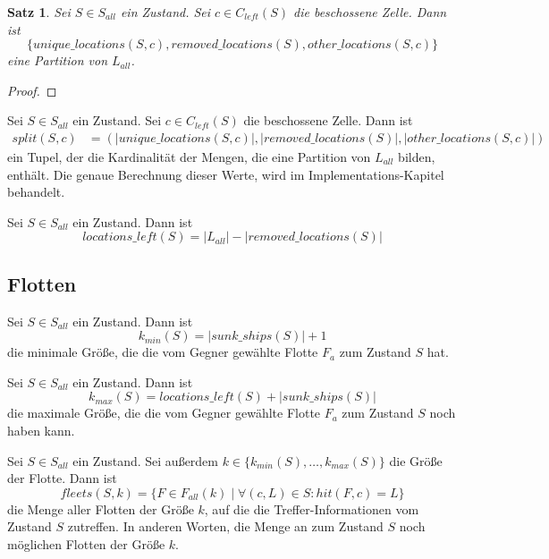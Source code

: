 \documentclass[a4paper,12pt]{llncs}
\numberwithin{equation}{section}
\newtheorem{satz}{Satz}
\begin{document}
\begin{satz}
Sei $S\in S_{all}$ ein Zustand.
Sei $c \in C_{left}(S)$ die beschossene Zelle.
Dann ist
\[
\{unique\_locations(S, c), removed\_locations(S), other\_locations(S, c)\}
\]
eine Partition von $L_{all}$.
\end{satz}

\begin{proof}
\end{proof}

\begin{definition}
Sei $S\in S_{all}$ ein Zustand.
Sei $c \in C_{left}(S)$ die beschossene Zelle.
Dann ist
\begin{align}
split(S,c)&=(|unique\_locations(S, c)|, |removed\_locations(S)|, |other\_locations(S, c)|)
\nonumber
\end{align}
ein Tupel, der die Kardinalität der Mengen, die eine Partition von $L_{all}$ bilden, enthält.
Die genaue Berechnung dieser Werte, wird im Implementations-Kapitel behandelt.
\end{definition}

\begin{definition}
Sei $S\in S_{all}$ ein Zustand.
Dann ist
\[
locations\_left(S)=|L_{all}| - |removed\_locations(S)|
\]
\end{definition}

\subsection{Flotten}

\begin{definition}
Sei $S\in S_{all}$ ein Zustand.
Dann ist
\[
k_{min}(S)=|sunk\_ships(S)| + 1
\]
die minimale Größe, die die vom Gegner gewählte Flotte $F_a$ zum Zustand $S$ hat.
\end{definition}

\begin{definition}
Sei $S\in S_{all}$ ein Zustand.
Dann ist
\[
k_{max}(S)=locations\_left(S) + |sunk\_ships(S)|
\]
die maximale Größe, die die vom Gegner gewählte Flotte $F_a$ zum Zustand $S$ noch haben kann.
\end{definition}

\begin{definition}
Sei $S\in S_{all}$ ein Zustand.
Sei außerdem $k \in \{k_{min}(S), \dots, k_{max}(S)\}$ die Größe der Flotte.
Dann ist
\[
fleets(S, k)=\{F\in F_{all}(k) \mid \forall (c,L) \in S \colon hit(F, c)=L\}
\]
die Menge aller Flotten der Größe $k$, auf die die Treffer-Informationen vom Zustand $S$ zutreffen.
In anderen Worten, die Menge an zum Zustand $S$ noch möglichen Flotten der Größe $k$.
\end{definition}
\end{document}
